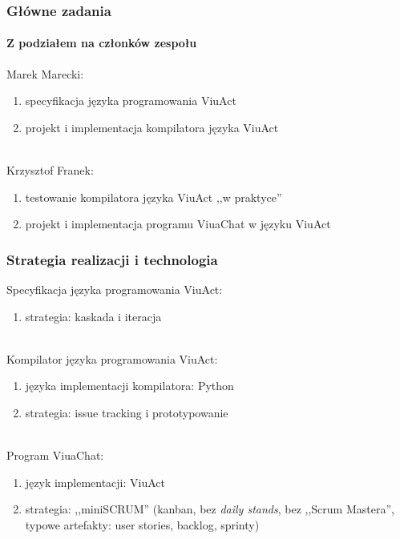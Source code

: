 \documentclass{beamer}
\begin{document}
\begin{frame}
    \frametitle{Główne zadania}
    \framesubtitle{Z podziałem na członków zespołu}

    Marek Marecki:
    \begin{enumerate}
        \item specyfikacja języka programowania ViuAct
        \item projekt i implementacja kompilatora języka ViuAct
    \end{enumerate}

    ~\\

    Krzysztof Franek:
    \begin{enumerate}
        \item testowanie kompilatora języka ViuAct ,,w praktyce''
        \item projekt i implementacja programu ViuaChat w języku ViuAct
    \end{enumerate}
\end{frame}

\begin{frame}
    \frametitle{Strategia realizacji i technologia}

    Specyfikacja języka programowania ViuAct:
    \begin{enumerate}
        \item strategia: kaskada i iteracja
    \end{enumerate}

    ~\\

    Kompilator języka programowania ViuAct:
    \begin{enumerate}
        \item języka implementacji kompilatora: Python
        \item strategia: issue tracking i prototypowanie
    \end{enumerate}

    ~\\

    Program ViuaChat:
    \begin{enumerate}
        \item język implementacji: ViuAct
        \item strategia: ,,miniSCRUM'' (kanban, bez \emph{daily stands}, bez
            ,,Scrum Mastera'', typowe artefakty: user stories, backlog, sprinty)
    \end{enumerate}
\end{frame}
\end{document}
